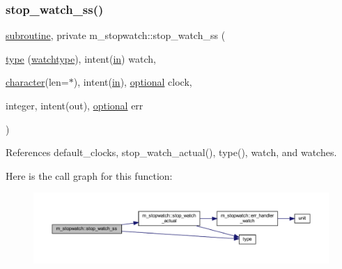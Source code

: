 \subsubsection{\texorpdfstring{stop\+\_\+watch\+\_\+ss()}{stop\_watch\_ss()}}
{\footnotesize\ttfamily \hyperlink{M__stopwatch_83_8txt_acfbcff50169d691ff02d4a123ed70482}{subroutine}, private m\+\_\+stopwatch\+::stop\+\_\+watch\+\_\+ss (\begin{DoxyParamCaption}\item[{\hyperlink{stop__watch_83_8txt_a70f0ead91c32e25323c03265aa302c1c}{type} (\hyperlink{structm__stopwatch_1_1watchtype}{watchtype}), intent(\hyperlink{M__journal_83_8txt_afce72651d1eed785a2132bee863b2f38}{in})}]{watch,  }\item[{\hyperlink{option__stopwatch_83_8txt_abd4b21fbbd175834027b5224bfe97e66}{character}(len=$\ast$), intent(\hyperlink{M__journal_83_8txt_afce72651d1eed785a2132bee863b2f38}{in}), \hyperlink{option__stopwatch_83_8txt_aa4ece75e7acf58a4843f70fe18c3ade5}{optional}}]{clock,  }\item[{integer, intent(out), \hyperlink{option__stopwatch_83_8txt_aa4ece75e7acf58a4843f70fe18c3ade5}{optional}}]{err }\end{DoxyParamCaption})\hspace{0.3cm}{\ttfamily [private]}}



References default\+\_\+clocks, stop\+\_\+watch\+\_\+actual(), type(), watch, and watches.

Here is the call graph for this function\+:
\nopagebreak
\begin{figure}[H]
\begin{center}
\leavevmode
\includegraphics[width=350pt]{namespacem__stopwatch_ad2412b50e118e372b548e3b9317f9ed4_cgraph}
\end{center}
\end{figure}
\mbox{\label{namespacem__stopwatch_a38967ac58362f42dc3c5cc27acbdb24f}} 
